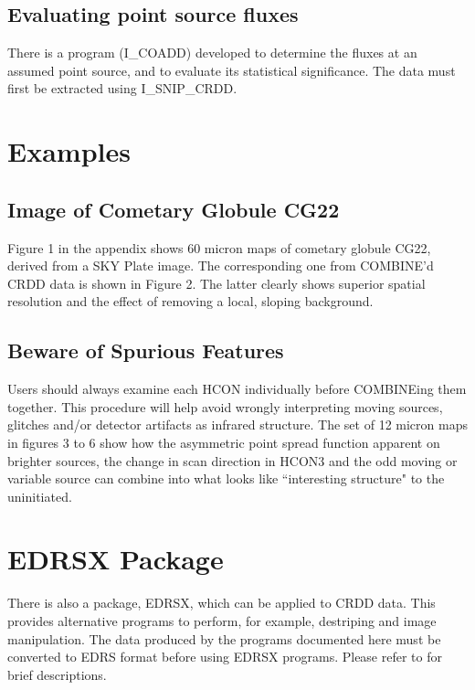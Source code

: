 \documentclass[nolof,noabs,11pt]{starlink}
\begin{document}
\subsection{Evaluating point source fluxes}

There is a program (I\_COADD) developed to determine the fluxes at an assumed
point source, and to evaluate its statistical significance. The data must
first be extracted using I\_SNIP\_CRDD.

\section {Examples}

\subsection {Image of Cometary Globule CG22}

Figure 1 in the appendix shows 60 micron maps of cometary globule CG22, derived
from a SKY Plate image. The corresponding one from COMBINE'd CRDD data is shown
in Figure 2. The latter clearly shows superior spatial resolution and the
effect of removing a local, sloping background.

\subsection {Beware of Spurious Features}

Users should always examine each HCON individually before COMBINEing them
together. This procedure will help avoid wrongly interpreting moving sources,
glitches and/or detector artifacts as infrared structure. The set of 12 micron
maps in figures 3 to 6 show how the asymmetric point spread function apparent
on brighter sources, the change in scan direction in HCON3 and the odd moving
or variable source can combine into what looks like ``interesting structure" to
the uninitiated.

\section {EDRSX Package}

There is also a package, EDRSX, which can be applied to CRDD data. This provides
alternative programs to perform, for example, destriping and image
manipulation. The data produced by the programs documented here must be
converted to EDRS format before using EDRSX programs. Please refer to  for
brief descriptions.
\end{document}
